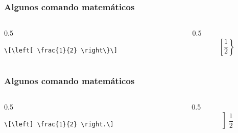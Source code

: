 \documentclass[12pt,aspectratio=169,ignorenonframetext]{ltxbeamer}
\begin{document}
\begin{frame}[fragile]
\frametitle{Algunos comando matemáticos}

\begin{columns}
    \begin{column}{0.5\textwidth}
        \begin{verbatim}
\[\left[ \frac{1}{2} \right\}\]
        \end{verbatim}
    \end{column}
    {\color{gray} \vline}
    \begin{column}{0.5\textwidth}
        \[\left[ \frac{1}{2} \right\}\]
    \end{column}
\end{columns}
\end{frame}





\begin{frame}[fragile]
\frametitle{Algunos comando matemáticos}

\begin{columns}
    \begin{column}{0.5\textwidth}
        \begin{verbatim}
\[\left] \frac{1}{2} \right.\]
        \end{verbatim}
    \end{column}
    {\color{gray} \vline}
    \begin{column}{0.5\textwidth}
        \[\left] \frac{1}{2} \right.\]
    \end{column}
\end{columns}
\end{frame}
\end{document}
